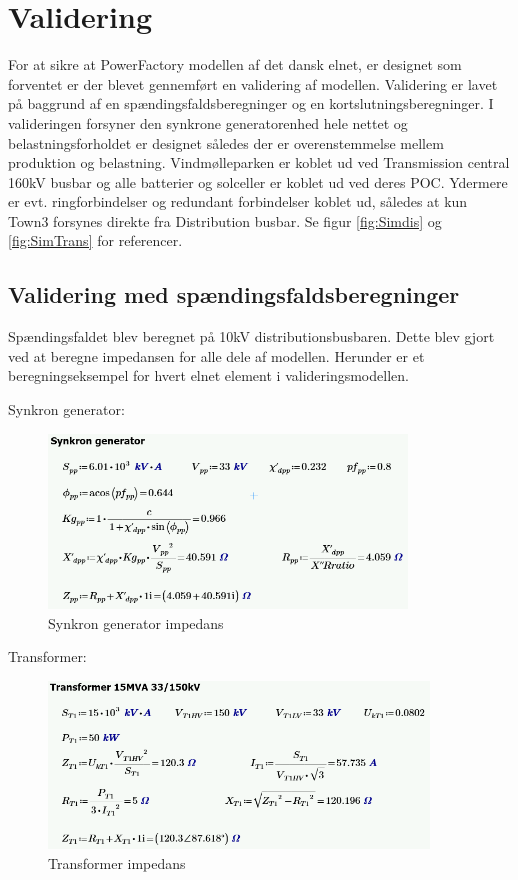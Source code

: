
\label{Validering}
\section{Validering}

For at sikre at PowerFactory modellen af det dansk elnet, er designet som forventet er der blevet gennemført en validering af modellen. Validering er lavet på baggrund af en spændingsfaldsberegninger og en kortslutningsberegninger. I valideringen forsyner den synkrone generatorenhed hele nettet og belastningsforholdet er designet således der er overenstemmelse mellem produktion og belastning. Vindmølleparken er koblet ud ved Transmission central 160kV busbar og alle batterier og solceller er koblet ud ved deres POC. Ydermere er evt. ringforbindelser og redundant forbindelser koblet ud, således at kun Town3 forsynes direkte fra Distribution busbar. Se figur \ref{fig:Simdis} og \ref{fig:SimTrans} for referencer.

\subsection{Validering med spændingsfaldsberegninger}
Spændingsfaldet blev beregnet på 10kV distributionsbusbaren. Dette blev gjort ved at beregne impedansen for alle dele af modellen. Herunder er et beregningseksempel for hvert elnet element i valideringsmodellen.

Synkron generator:
\begin{figure}[H] %
	\centering
	\includegraphics[width=0.85\textwidth]{figurer/Synkron_generator_validering}
	\caption{Synkron generator impedans}
	\label{fig:SGimpedans}
\end{figure}

Transformer:
\begin{figure}[H] %
	\centering
	\includegraphics[width=0.9\textwidth]{figurer/Transformer_validering}
	\caption{Transformer impedans}
	\label{fig:Trafoimpedans}
\end{figure}

